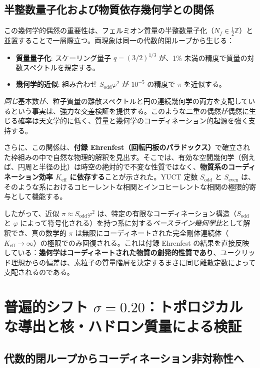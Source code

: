 \documentclass[11pt,a4paper]{article}
\theoremstyle{remark}
\begin{document}
	\subsection{半整数量子化および物質依存幾何学との関係}
	
	この幾何学的偶然の重要性は、フェルミオン質量の半整数量子化（\(N_f \in \frac{1}{2}\mathbb{Z}\)）と並置することで一層際立つ。両現象は同一の代数的閉ループから生じる：
	\begin{itemize}
		\item \textbf{質量量子化}: スケーリング量子 \(q = (3/2)^{1/3}\) が、1\% 未満の精度で質量の対数スペクトルを規定する。
		\item \textbf{幾何学的近似}: 組み合わせ \(S_{\mathrm{odd}}\varphi^2\) が \(10^{-5}\) の精度で \(\pi\) を近似する。
	\end{itemize}
	\emph{同じ}基本数が、粒子質量の離散スペクトルと円の連続幾何学の両方を支配しているという事実は、強力な交差検証を提供する。このような二重の偶然が偶然に生じる確率は天文学的に低く、質量と幾何学のコーディネーション的起源を強く支持する。
	
	さらに、この関係は、\textbf{付録 Ehrenfest（回転円板のパラドックス）}で確立された枠組みの中で自然な物理的解釈を見出す。そこでは、有効な空間幾何学（例えば、円周と半径の比）は時空の絶対的で不変な性質ではなく、\textbf{物質系のコーディネーション効率 \(K_{\mathrm{eff}}\) に依存する}ことが示された。YUCT 定数 \(S_{\mathrm{odd}}\) と \(S_{\mathrm{even}}\) は、そのような系におけるコヒーレントな相関とインコヒーレントな相関の極限的寄与として機能する。
	
	したがって、近似 \(\pi \approx S_{\mathrm{odd}}\varphi^2\) は、特定の有限なコーディネーション構造（\(S_{\mathrm{odd}}\) と \(\varphi\) によって符号化される）を持つ系に対する\emph{ベースライン幾何学比}として解釈でき、真の数学的 \(\pi\) は無限にコーディネートされた完全剛体連続体（\(K_{\mathrm{eff}} \to \infty\)）の極限でのみ回復される。これは付録 Ehrenfest の結果を直接反映している：\textbf{幾何学はコーディネートされた物質の創発的性質であり}、ユークリッド理想からの偏差は、素粒子の質量階層を決定するまさに同じ離散定数によって支配されるのである。
	
	\section{普遍的シフト \(\sigma = 0.20\)：トポロジカルな導出と核・ハドロン質量による検証}
	\label{sec:sigma}
	
	\subsection{代数的閉ループからコーディネーション非対称性へ}
	
\end{document}

